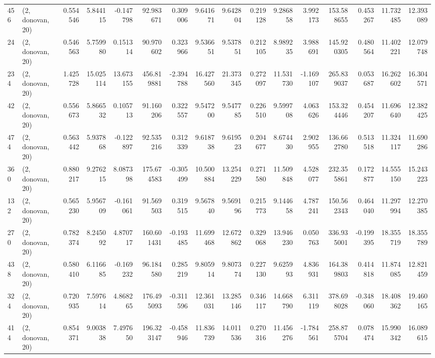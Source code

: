 \begin{tabular}{llrrrrrrrrrrrrrr}
456 &  (2, donovan, 20) &   0.554546 &   5.844115 &  -0.147798 &    92.983671 &   0.309006 &   9.641671 &   9.642804 &  0.219128 &   9.286858 &   3.992173 &   153.588655 &   0.453267 &  11.732485 &  12.393089 \\
24  &  (2, donovan, 20) &   0.546563 &   5.759980 &   0.151314 &    90.970602 &   0.323966 &   9.536651 &   9.537851 &  0.212105 &   8.989235 &   3.988691 &   145.920305 &   0.480564 &  11.402221 &  12.079748 \\
234 &  (2, donovan, 20) &   1.425728 &  15.025114 &  13.673155 &   456.819881 &  -2.394788 &  16.427560 &  21.373345 &  0.272097 &  11.531730 &  -1.169107 &   265.839037 &   0.053687 &  16.262602 &  16.304571 \\
42  &  (2, donovan, 20) &   0.556673 &   5.866532 &   0.105713 &    91.160206 &   0.322557 &   9.547200 &   9.547785 &  0.226510 &   9.599708 &   4.063626 &   153.324446 &   0.454207 &  11.696640 &  12.382425 \\
474 &  (2, donovan, 20) &   0.563442 &   5.937868 &  -0.122897 &    92.535216 &   0.312339 &   9.618738 &   9.619523 &  0.204677 &   8.674430 &   2.902955 &   136.662780 &   0.513518 &  11.324117 &  11.690286 \\
360 &  (2, donovan, 20) &   0.880217 &   9.276215 &   8.087398 &   175.674583 &  -0.305499 &  10.500884 &  13.254229 &  0.271580 &  11.509848 &   4.528077 &   232.355861 &   0.172877 &  14.555150 &  15.243223 \\
132 &  (2, donovan, 20) &   0.565230 &   5.956709 &  -0.161061 &    91.569503 &   0.319515 &   9.567840 &   9.569196 &  0.215773 &   9.144658 &   4.787241 &   150.562343 &   0.464040 &  11.297994 &  12.270385 \\
270 &  (2, donovan, 20) &   0.782374 &   8.245092 &   4.870717 &   160.601431 &  -0.193485 &  11.699468 &  12.672862 &  0.329068 &  13.946230 &   0.050763 &   336.935001 &  -0.199395 &  18.355719 &  18.355789 \\
438 &  (2, donovan, 20) &   0.580410 &   6.116685 &  -0.169232 &    96.184580 &   0.285219 &   9.805914 &   9.807374 &  0.227130 &   9.625993 &   4.836931 &   164.389803 &   0.414818 &  11.874085 &  12.821459 \\
324 &  (2, donovan, 20) &   0.720935 &   7.597614 &   4.868265 &   176.495093 &  -0.311596 &  12.361031 &  13.285146 &  0.346117 &  14.668790 &   6.311119 &   378.698028 &  -0.348060 &  18.408362 &  19.460165 \\
414 &  (2, donovan, 20) &   0.854371 &   9.003838 &   7.497650 &   196.323147 &  -0.458946 &  11.836739 &  14.011536 &  0.270316 &  11.456276 &  -1.784561 &   258.875704 &   0.078474 &  15.990342 &  16.089615 \\

\end{tabular}
